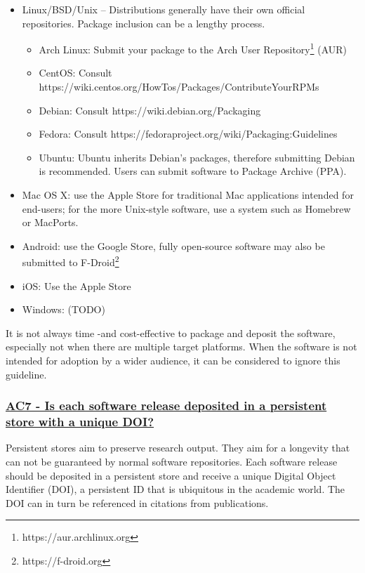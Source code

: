 \documentclass[a4paper,11pt]{article}
\newcommand{\criterion}[2]{\subsubsection*{\underline{#1 - #2}}\label{id:#1}}
\newcommand\CheckTable{%
  \begin{tabular}{ccccc}
    No & Minimal & Adequate & Good & Perfect \\
    0 & 1 & 2 & 3 & 4 \\
    \hline
    $\square$ & $\square$ & $\square$ & $\square$ & $\square$ \\
  \end{tabular}%
}
\begin{document}
\begin{itemize}
    \item Linux/BSD/Unix -- Distributions generally have their own official repositories. Package inclusion can be a lengthy process.
    \begin{itemize}
        \item Arch Linux: Submit your package to the Arch User Repository\footnote{https://aur.archlinux.org} (AUR)
		\item CentOS: Consult https://wiki.centos.org/HowTos/Packages/ContributeYourRPMs
        \item Debian: Consult https://wiki.debian.org/Packaging
        \item Fedora: Consult https://fedoraproject.org/wiki/Packaging:Guidelines
        \item Ubuntu: Ubuntu inherits Debian's packages, therefore submitting Debian is recommended. Users can submit software  to Package Archive (PPA).
    \end{itemize}
    \item Mac OS X: use the Apple Store for traditional Mac applications intended for end-users; for the more Unix-style
        software, use a system such as Homebrew or MacPorts.
    \item Android: use the Google Store, fully open-source software may also be submitted to F-Droid\footnote{https://f-droid.org}
    \item iOS: Use the Apple Store
    \item Windows: (TODO) 
\end{itemize}

It is not always time -and cost-effective to package and deposit the software,
especially not when there are multiple target platforms. When the software is
not intended for adoption by a wider audience, it can be considered to ignore
this guideline.


\newcommand{\acSevenID}{AC7}
\newcommand{\acSevenText}{Is each software release deposited in a persistent store with a unique DOI?}
\criterion{\acSevenID}{\acSevenText}

Persistent stores aim to preserve research output. They aim for a longevity
that can not be guaranteed by normal software repositories. Each software
release should be deposited in a persistent store and receive a unique Digital
Object Identifier (DOI),  a persistent ID that is ubiquitous in the academic
world. The DOI can in turn be referenced in citations from publications.
\end{document}
